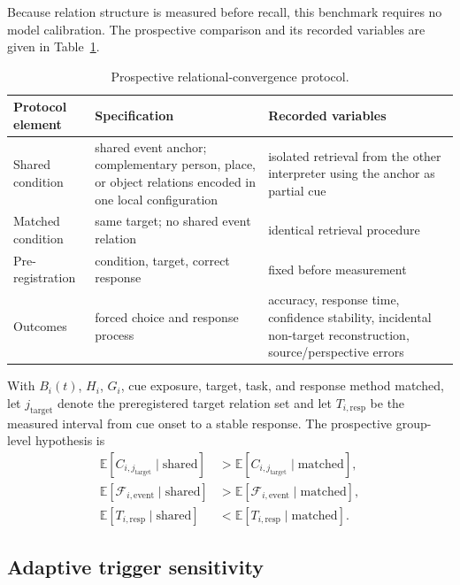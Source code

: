 Because relation structure is measured before recall, this benchmark requires no
model calibration. The prospective comparison and its recorded variables are given in
Table~\ref{tab:relational_convergence_protocol}.

\begin{table}[H]
\centering
\footnotesize
\begin{tabular}{@{}p{3.0cm}p{4.8cm}p{5.3cm}@{}}
\toprule
Protocol element & Specification & Recorded variables \\
\midrule
Shared condition & shared event anchor; complementary person, place, or object relations encoded in one local configuration & isolated retrieval from the other interpreter using the anchor as partial cue \\
Matched condition & same target; no shared event relation & identical retrieval procedure \\
Pre-registration & condition, target, correct response & fixed before measurement \\
Outcomes & forced choice and response process & accuracy, response time, confidence stability, incidental non-target reconstruction, source/perspective errors \\
\bottomrule
\end{tabular}
\caption{Prospective relational-convergence protocol.}
\label{tab:relational_convergence_protocol}
\end{table}

With $B_i(t)$, $H_i$, $G_i$, cue exposure, target, task, and response method matched,
let $j_{\mathrm{target}}$ denote the preregistered target relation set and let
$T_{i,\mathrm{resp}}$ be the measured interval from cue onset to a stable response.
The prospective group-level hypothesis is
\begin{equation}
\begin{aligned}
  \mathbb{E}[C_{i,j_{\mathrm{target}}}\mid\mathrm{shared}]&>
    \mathbb{E}[C_{i,j_{\mathrm{target}}}\mid\mathrm{matched}],\\
  \mathbb{E}[\mathcal F_{i,\mathrm{event}}\mid\mathrm{shared}]&>
    \mathbb{E}[\mathcal F_{i,\mathrm{event}}\mid\mathrm{matched}],\\
  \mathbb{E}[T_{i,\mathrm{resp}}\mid\mathrm{shared}]&<
    \mathbb{E}[T_{i,\mathrm{resp}}\mid\mathrm{matched}].
\end{aligned}
  \label{eq:cross_client_convergence_hypothesis}
\end{equation}
\subsection{Adaptive trigger sensitivity}

